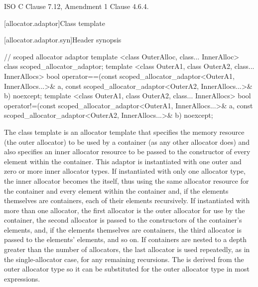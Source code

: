 \xref
ISO C Clause 7.12, Amendment 1 Clause 4.6.4.

[allocator.adaptor]{Class template }

[allocator.adaptor.syn]{Header  synopsis}

%
\begin{codeblock}
  // scoped allocator adaptor
  template <class OuterAlloc, class... InnerAlloc>
    class scoped_allocator_adaptor;
  template <class OuterA1, class OuterA2, class... InnerAllocs>
    bool operator==(const scoped_allocator_adaptor<OuterA1, InnerAllocs...>& a,
                    const scoped_allocator_adaptor<OuterA2, InnerAllocs...>& b) noexcept;
  template <class OuterA1, class OuterA2, class... InnerAllocs>
    bool operator!=(const scoped_allocator_adaptor<OuterA1, InnerAllocs...>& a,
                    const scoped_allocator_adaptor<OuterA2, InnerAllocs...>& b) noexcept;
\end{codeblock}

\pnum
The class template  is an allocator template that
specifies the memory resource (the outer allocator) to be used by a container (as any
other allocator does) and also specifies an inner allocator resource to be passed to the
constructor of every element within the container. This adaptor is instantiated with one
outer and zero or more inner allocator types. If instantiated with only one allocator
type, the inner allocator becomes the  itself, thus
using the same allocator resource for the container and every element within the
container and, if the elements themselves are containers, each of their elements
recursively. If instantiated with more than one allocator, the first allocator is the
outer allocator for use by the container, the second allocator is passed to the
constructors of the container's elements, and, if the elements themselves are
containers, the third allocator is passed to the elements' elements, and so on. If
containers are nested to a depth greater than the number of allocators, the last
allocator is used repeatedly, as in the single-allocator case, for any remaining
recursions. \enternote The  is derived from the outer
allocator type so it can be substituted for the outer allocator type in most
expressions. \exitnote

